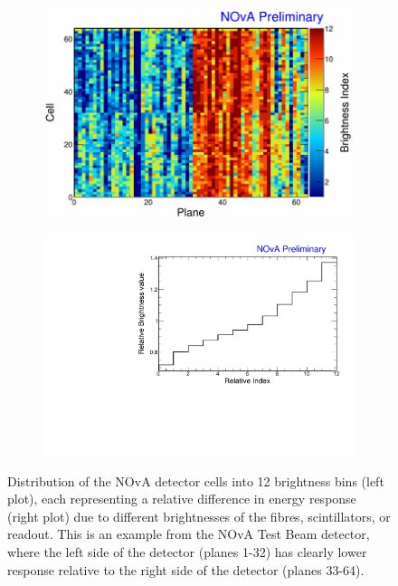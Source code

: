 
\begin{figure}[hbtp]
\centering
\begin{subfigure}[b]{0.495\textwidth}
\centering
\includegraphics[width=\textwidth]{Plots/NOvAExperiment/BrightnessIndex.png}
\end{subfigure}
\begin{subfigure}[b]{0.495\textwidth}
\centering
\includegraphics[width=\textwidth]{Plots/NOvAExperiment/BrightnessIndexToValue.pdf}
\end{subfigure}
\caption[Fibre Brightness bins for the NOvA calibration]{Distribution of the \acrshort{NOvA} detector cells into 12 brightness bins (left plot), each representing a relative difference in energy response (right plot) due to different brightnesses of the fibres, scintillators, or readout. This is an example from the \acrshort{NOvA} Test Beam detector, where the left side of the detector (planes 1-32) has clearly lower response relative to the right side of the detector (planes 33-64).}
\label{fig:NOvAFiberBrightness}
\end{figure}

